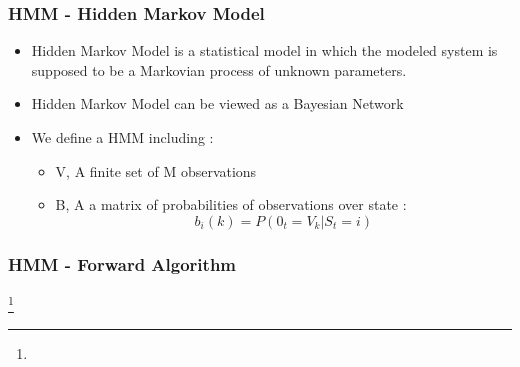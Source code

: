 \documentclass{beamer}
\renewcommand{\footfullcite}[1]{\footnote[frame]{\fullcite{#1}}}
\begin{document}
\begin{frame}
  \frametitle{HMM - Hidden Markov Model}
  \begin{itemize}[label=--]
  \item Hidden Markov Model is a statistical model in which the
    modeled system is supposed to be a Markovian process of unknown
    parameters.\pause
  \item Hidden Markov Model can be viewed as a Bayesian Network\pause
  \item We define a HMM including :
    \begin{itemize}
    \item V, A finite set of M observations
    \item B, A a matrix of probabilities of observations
      over state :
      $$b_i(k) = P(0_t=V_k | S_t = i)$$
    \end{itemize}
  \end{itemize}
\end{frame}

\begin{frame}
  \frametitle{HMM - Forward Algorithm}
  \footfullcite{forward_algo}
\end{frame}
\end{document}
